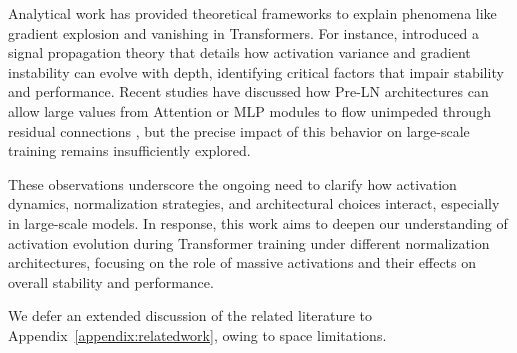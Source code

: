 Analytical work has provided theoretical frameworks to explain phenomena like gradient explosion and vanishing in Transformers. For instance, \citet{transformersgetstable} introduced a signal propagation theory that details how activation variance and gradient instability can evolve with depth, identifying critical factors that impair stability and performance. Recent studies have discussed how Pre-LN architectures can allow large values from Attention or MLP modules to flow unimpeded through residual connections \citep{moeut, mlpswiglu, attentioncollapse, smallproxies}, but the precise impact of this behavior on large-scale training remains insufficiently explored.

These observations underscore the ongoing need to clarify how activation dynamics, normalization strategies, and architectural choices interact, especially in large-scale models. In response, this work aims to deepen our understanding of activation evolution during Transformer training under different normalization architectures, focusing on the role of massive activations and their effects on overall stability and performance.

We defer an extended discussion of the related literature to Appendix~\ref{appendix:relatedwork}, owing to space limitations.
